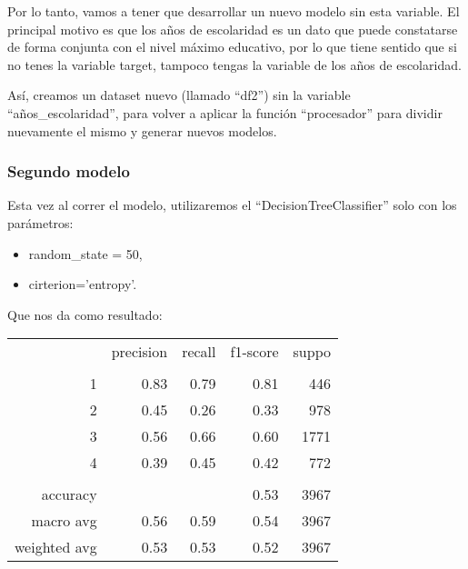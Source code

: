 \documentclass[a4paper]{article}
\begin{document}
            Por lo tanto, vamos a tener que desarrollar un nuevo modelo sin esta variable. El principal motivo es que los años de escolaridad es un dato que puede constatarse de forma conjunta con el nivel máximo educativo, por lo que tiene sentido que si no tenes la variable target, tampoco tengas la variable de los años de escolaridad.

            Así, creamos un dataset nuevo (llamado ``df2'') sin la variable ``años\_escolaridad'', para volver a aplicar la función ``procesador'' para dividir nuevamente el mismo y generar nuevos modelos.

        \subsubsection{Segundo modelo}

            Esta vez al correr el modelo, utilizaremos el ``DecisionTreeClassifier'' solo con los parámetros:
            \begin{itemize}
                \item random\_state = 50,
                \item cirterion='entropy'.
            \end{itemize}
            Que nos da como resultado:  

            \begin{table}[!ht]
                \centering
                \begin{tabular}{rrrrr}
                    ~ & precision & recall & f1-score & suppo \\
                    & & & & \\
                    1 & 0.83 & 0.79 & 0.81 & 446 \\
                    2 & 0.45 & 0.26 & 0.33 & 978 \\
                    3 & 0.56 & 0.66 & 0.60 & 1771 \\
                    4 & 0.39 & 0.45 & 0.42 & 772 \\
                    & & & & \\
                    accuracy & & & 0.53 & 3967 \\
                    macro avg & 0.56 & 0.59 & 0.54 & 3967 \\
                    weighted avg & 0.53 & 0.53 & 0.52 & 3967 \\
                \end{tabular}
            \end{table}
\end{document}
